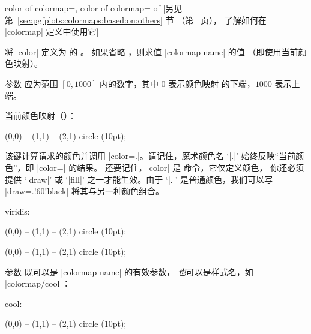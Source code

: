 \begin{pgfplotskeylist}{%
    color of colormap=,
    color of colormap= of %
}
    [另见第~\ref{sec:pgfplots:colormaps:based:on:others} 节
    （第~\pageref{sec:pgfplots:colormaps:based:on:others} 页），
    了解如何在 |colormap| 定义中使用它]

    将 \tikzname{} |color| 定义为  的 。
    如果省略 ，则求值 |colormap name| 的值
    （即使用当前颜色映射）。

    参数  应为范围 $[0,1000]$ 内的数字，其中 $0$ 表示颜色映射
    的下端，$1000$ 表示上端。

    当前颜色映射（）：

\begin{codeexample}[]
\tikz\fill [color of colormap={800}, thick,
    draw=.!60!black]
        (0,0) -- (1,1) -- (2,1) circle (10pt);
\end{codeexample}

    该键计算请求的颜色并调用 |color=.|。请记住，魔术颜色名 `|.|'
    始终反映``当前颜色''，即 |color=| 的结果。
    还要记住，|color| 是 \tikzname{} 命令，它仅定义颜色，
    你还必须提供 `|draw|' 或 `|fill|' 之一才能生效。由于 `|.|'
    是普通颜色，我们可以写 |draw=.!60!black| 将其与另一种颜色组合。

    viridis: 

\begin{codeexample}[]
\pgfplotsset{colormap name=viridis}
\tikz\fill [color of colormap={1000},thick,
    draw=.!60!black]
        (0,0) -- (1,1) -- (2,1) circle (10pt);
\end{codeexample}

\begin{codeexample}[]
\tikz\fill [color of colormap={300 of viridis},thick,
    draw=.!60!black]
        (0,0) -- (1,1) -- (2,1) circle (10pt);
\end{codeexample}

    参数  既可以是 |colormap name| 的有效参数，
    \emph{也}可以是样式名，如 |colormap/cool|：

    cool: 

\begin{codeexample}[]
\tikz\fill [color of colormap={300 of colormap/cool},
    thick,draw=.!60!black]
        (0,0) -- (1,1) -- (2,1) circle (10pt);
\end{codeexample}


\end{pgfplotskeylist}
